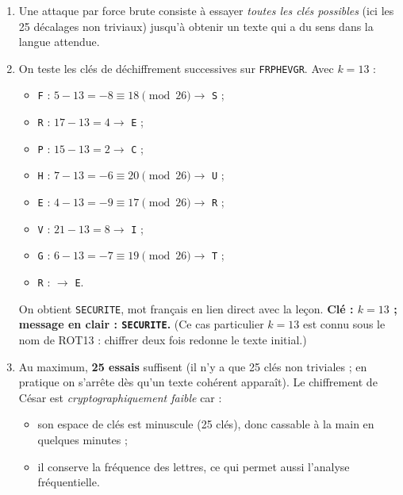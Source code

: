 \documentclass[11pt]{article}
\newcommand{\cle}[1]{{\popxbold\color{popdark}#1}}
\begin{document}
\begin{corrige}
\begin{enumerate}
\item Une attaque par \cle{force brute} consiste à essayer \emph{toutes les clés possibles} (ici les 25 décalages non triviaux) jusqu'à obtenir un texte qui a du sens dans la langue attendue.
\item On teste les clés de déchiffrement successives sur \texttt{FRPHEVGR}. Avec $k = 13$ :
\begin{itemize}
\item \texttt{F} : $5 - 13 = -8 \equiv 18 \pmod{26} \rightarrow$ \texttt{S} ;
\item \texttt{R} : $17 - 13 = 4 \rightarrow$ \texttt{E} ;
\item \texttt{P} : $15 - 13 = 2 \rightarrow$ \texttt{C} ;
\item \texttt{H} : $7 - 13 = -6 \equiv 20 \pmod{26} \rightarrow$ \texttt{U} ;
\item \texttt{E} : $4 - 13 = -9 \equiv 17 \pmod{26} \rightarrow$ \texttt{R} ;
\item \texttt{V} : $21 - 13 = 8 \rightarrow$ \texttt{I} ;
\item \texttt{G} : $6 - 13 = -7 \equiv 19 \pmod{26} \rightarrow$ \texttt{T} ;
\item \texttt{R} : $\rightarrow$ \texttt{E}.
\end{itemize}
On obtient \texttt{SECURITE}, mot français en lien direct avec la leçon. \textbf{Clé : $k = 13$ ; message en clair : \texttt{SECURITE}.} (Ce cas particulier $k = 13$ est connu sous le nom de ROT13 : chiffrer deux fois redonne le texte initial.)
\item Au maximum, \textbf{25 essais} suffisent (il n'y a que 25 clés non triviales ; en pratique on s'arrête dès qu'un texte cohérent apparaît). Le chiffrement de César est \emph{cryptographiquement faible} car :
\begin{itemize}
\item son espace de clés est minuscule (25 clés), donc cassable à la main en quelques minutes ;
\item il conserve la fréquence des lettres, ce qui permet aussi l'analyse fréquentielle.
\end{itemize}
\end{enumerate}
\end{corrige}
\end{document}
